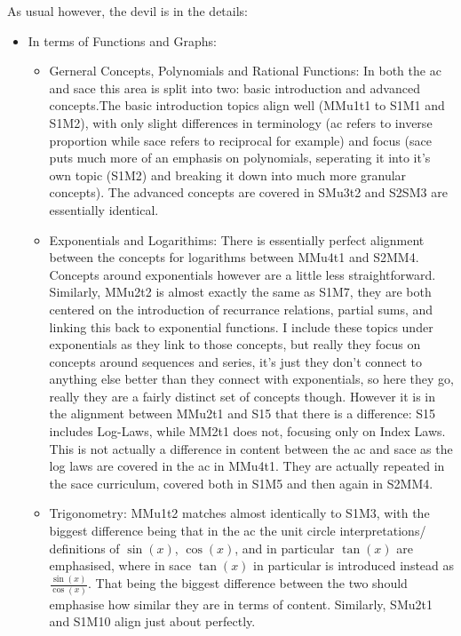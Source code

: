 \documentclass[twoside,12pt,a4paper]{report}
\begin{document}
As usual however, the devil is in the details:
\begin{itemize}
	\item In terms of Functions and Graphs:
		\begin{itemize}
			\item Gerneral Concepts, Polynomials and Rational Functions: In both the \gls{ac} and \gls{sace} this area is split into two: basic introduction and advanced concepts.The basic introduction topics align well (MMu1t1 to S1M1 and S1M2), with only slight differences in terminology (\gls{ac} refers to inverse proportion while \gls{sace} refers to reciprocal for example) and focus (\gls{sace} puts much more of an emphasis on polynomials, seperating it into it's own topic (S1M2) and breaking it down into much more granular concepts). The advanced concepts are covered in SMu3t2 and S2SM3 are essentially identical.
			\item Exponentials and Logarithims: There is essentially perfect alignment between the concepts for logarithms between MMu4t1 and S2MM4. Concepts around exponentials however are a little less straightforward. Similarly, MMu2t2 is almost exactly the same as S1M7, they are both centered on the introduction of recurrance relations, partial sums, and linking this back to exponential functions. I include these topics under exponentials as they link to those concepts, but really they focus on concepts around sequences and series, it's just they don't connect to anything else better than they connect with exponentials, so here they go, really they are a fairly distinct set of concepts though. However it is in the alignment between MMu2t1 and S15 that there is a difference: S15 includes Log-Laws, while MM2t1 does not, focusing only on Index Laws. This is not actually a difference in content between the \gls{ac} and \gls{sace} as the log laws are covered in the \gls{ac} in MMu4t1. They are actually repeated in the \gls{sace} curriculum, covered both in S1M5 and then again in S2MM4.
			\item Trigonometry: MMu1t2 matches almost identically to S1M3, with the biggest difference being that in the \gls{ac} the unit circle interpretations/ definitions of $\sin(x)$, $\cos(x)$, and in particular $\tan(x)$ are emphasised, where in \gls{sace} $\tan(x)$ in particular is introduced instead as $\frac{\sin(x)}{\cos(x)}$. That being the biggest difference between the two should emphasise how similar they are in terms of content. Similarly, SMu2t1 and S1M10 align just about perfectly. 
		\end{itemize}

\end{itemize}
\end{document}
